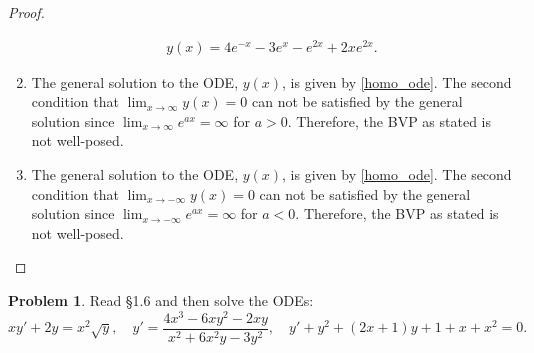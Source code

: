 \documentclass[12pt]{article}
\theoremstyle{definition}
\newtheorem{problem}{Problem}
\begin{document}
\begin{proof}
\begin{enumerate}
\begin{align*}
        y(x) = 4 e^{-x} -3e^{x} -e^{2x} +2xe^{2x}.
      \end{align*}
    \item The general solution to the ODE, $y(x)$, is given by \eqref{homo_ode}.
      The second condition that $\lim_{x\to\infty} y(x) = 0$ can not be satisfied
      by the general solution since $\lim_{x\to\infty} e^{ax} = \infty$ for $a>0$. Therefore,
      the BVP as stated is not well-posed.
    \item The general solution to the ODE, $y(x)$, is given by \eqref{homo_ode}.
      The second condition that $\lim_{x\to-\infty} y(x) = 0$ can not be satisfied
      by the general solution since $\lim_{x\to-\infty} e^{ax} = \infty$ for $a<0$. Therefore,
      the BVP as stated is not well-posed.
  \end{enumerate}
\end{proof}
\newpage


\begin{problem}
  Read \S1.6 and then solve the ODEs:
  $$xy' + 2y = x^2\sqrt{y}, \quad y' = \frac{4x^3-6xy^2-2xy}{x^2+6x^2y-3y^2}, \quad y' + y^2 +(2x+1)y + 1 + x + x^2 = 0.$$
\end{problem}
\end{document}
